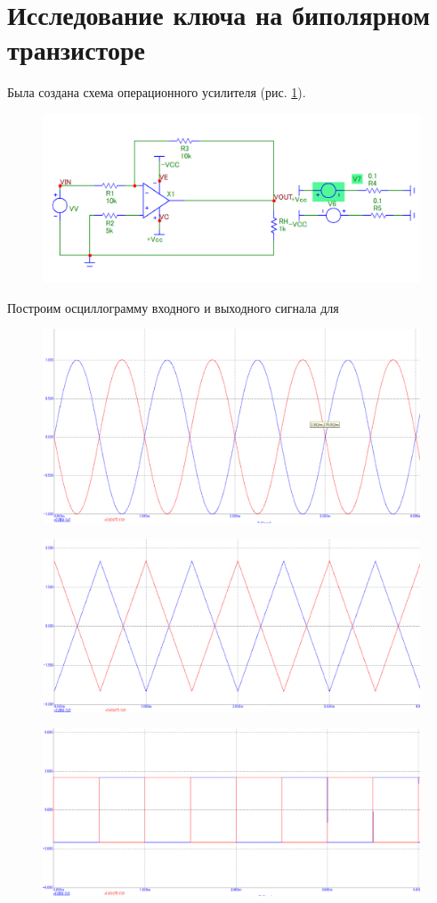 \documentclass[a4paper,14pt]{article}
\begin{document}

\pagebreak
\section{Исследование ключа на биполярном транзисторе}

Была создана схема операционного усилителя (рис. \ref{fig:shop}).

\begin{figure}[H]
	\centering
	\includegraphics[width=0.9\linewidth]{image/sh_op}
	\caption{}
	\label{fig:shop}
\end{figure}

Построим осциллограмму входного и выходного сигнала для 

\begin{figure}[H]
	\centering
	\includegraphics[width=0.7\linewidth]{image/graf_1k_garm}
	\caption{}
	\label{fig:graf1kgarm}
\end{figure}

\begin{figure}[H]
	\centering
	\includegraphics[width=0.7\linewidth]{image/graf_1k_tre}
	\caption{}
	\label{fig:graf1ktre}
\end{figure}

\begin{figure}[H]
	\centering
	\includegraphics[width=0.7\linewidth]{image/graf_1k_rect}
	\caption{}
	\label{fig:graf1krect}
\end{figure}




 
\end{document}
